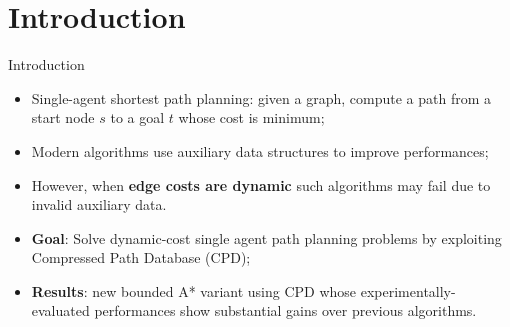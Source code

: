 \section*{Introduction}

\begin{frame}{Introduction}
    \begin{itemize}
        \item Single-agent shortest path planning: given a graph, compute a path from a start node $s$ to a goal $t$ whose cost is minimum;
        \item Modern algorithms use auxiliary data structures to improve performances;
        \item However, when \textbf{edge costs are dynamic} such algorithms may fail due to invalid auxiliary data.
        
        \medskip

        \item \textbf{Goal}: Solve dynamic-cost single agent path planning problems by exploiting Compressed Path Database (CPD);
        \item \textbf{Results}: new bounded A* variant using CPD whose experimentally-evaluated performances show substantial gains over previous algorithms.
    \end{itemize}
\end{frame}


